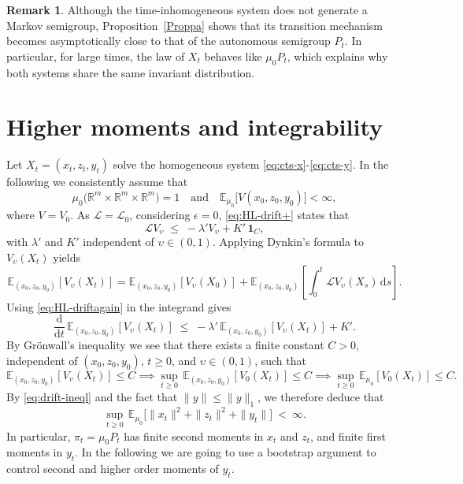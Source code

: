 \documentclass[11pt, a4paper,leqno]{amsart}
\theoremstyle{definition}
\newtheorem{remark}{Remark}[section]
\numberwithin{equation}{section}
\begin{document}
\begin{remark}
Although the time-inhomogeneous system does not generate a Markov semigroup,
Proposition~\ref{Proppa} shows that its transition mechanism becomes
asymptotically close to that of the autonomous semigroup \(P_t\).
In particular, for large times, the law of \(X_t\) behaves like \(\mu_0 P_t\),
which explains why both systems share the same invariant distribution.
\end{remark}



\section{Higher moments and integrability}\label{HMI} Let $X_t = ( x_t, z_t, y_t)$ solve the homogeneous system \eqref{eq:cts-x}-\eqref{eq:cts-y}. In the following we consistently assume that
\begin{equation}\label{intimeasureagain}
\mu_0\big(\mathbb R^m\times\mathbb R^m\times\mathbb R^m\big)=1
\quad\text{and}\quad
\mathbb{E}_{\mu_0}\!\big [V(x_0,z_0,y_0)\big]<\infty,
\end{equation}
where $V=V_0$. As ${\mathcal L}={\mathcal L}_0$, considering $\epsilon=0$, \eqref{eq:HL-drift+} states that
\begin{equation}\label{eq:HL-driftagain}
{\mathcal L} V_\upsilon\;\le\;-\lambda' V_\upsilon + K'\,\mathbf 1_{C},
\end{equation}
with $\lambda'$ and $K'$ independent of $\upsilon\in (0,1)$. Applying Dynkin's formula to $V_\upsilon(X_t)$ yields
\[
\mathbb{E}_{(x_0,z_0,y_0)}[V_\upsilon( X_t)]
= \mathbb{E}_{(x_0,z_0,y_0)}[V_\upsilon( X_0)]
+ \mathbb{E}_{(x_0,z_0,y_0)}\!\left[\int_0^t {\mathcal L} V_\upsilon( X_s)\,\mathrm{d}s\right].
\]
Using \eqref{eq:HL-driftagain} in the integrand gives
\[
\frac{\mathrm{d}}{\mathrm{d}t}\,\mathbb{E}_{(x_0,z_0,y_0)}[V_\upsilon( X_t)]
\;\le\; -\lambda'\,\mathbb{E}_{(x_0,z_0,y_0)}[V_\upsilon( X_t)] + K'.
\]
By Grönwall’s inequality we see that there exists a finite constant $C>0$, independent of $(x_0,z_0,y_0)$, $t\geq 0$, and $\upsilon\in (0,1)$, such that
\[
\mathbb{E}_{(x_0,z_0,y_0)}[V_\upsilon( X_t)]\leq C\implies
\sup_{t \ge 0}\,\mathbb{E}_{(x_0,z_0,y_0)}[V_0( X_t)]\leq C\implies
\sup_{t \ge 0}\,\mathbb{E}_{\mu_0}[V_0( X_t)]\leq C.
\]
By \eqref{eq:drift-ineql} and the fact that $\|y\|\le \|y\|_1$, we therefore deduce that
\begin{equation}\label{eq:2nd-moment-unif}
\sup_{t\ge0}\,\mathbb E_{\mu_0}\bigl[\| x_t\|^2+\| z_t\|^2+\| y_t\|\bigr]\ <\ \infty.
\end{equation}
In particular, $\pi_t=\mu_0P_t$ has finite second moments in $ x_t$ and $ z_t$, and finite first moments in $ y_t$. In the following we are going to use a bootstrap argument to control second and higher order moments of $y_t$.
\end{document}
